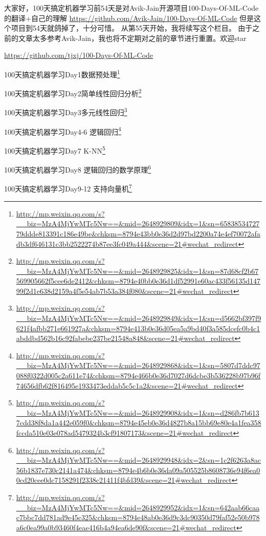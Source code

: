 \documentclass[]{ctexbook}
\renewcommand{\href}[2]{#2\footnote{\url{#1}}}
\begin{document}
大家好，100天搞定机器学习前54天是对Avik-Jain开源项目100-Days-Of-ML-Code的翻译+自己的理解 \url{https://github.com/Avik-Jain/100-Days-Of-ML-Code} 但是这个项目到54天就鸽掉了，十分可惜。
从第55天开始，我将续写这个栏目。 由于之前的文章太多参考Avik-Jain，我也将不定期对之前的章节进行重置。欢迎star

\url{https://github.com/tjxj/100-Days-Of-ML-Code}

\href{http://mp.weixin.qq.com/s?__biz=MzA4MjYwMTc5Nw==\&mid=2648929809\&idx=1\&sn=6583853472779ddde813391c186e49be\&chksm=8794e43bb0e36d2d97bd2200a74e4ef70072afadb3df646131c3bb2522274b87ee3fc049a444\&scene=21\#wechat_redirect}{100天搞定机器学习\textbar{}Day1数据预处理}

\href{http://mp.weixin.qq.com/s?__biz=MzA4MjYwMTc5Nw==\&mid=2648929825\&idx=1\&sn=87d68cf2b67569905662f5cee6de2412\&chksm=8794e40bb0e36d1df52991e60ac433f56135d14799f2d1e638d2159a4f5e54ab7b53a384f080\&scene=21\#wechat_redirect}{100天搞定机器学习\textbar{}Day2简单线性回归分析}

\href{http://mp.weixin.qq.com/s?__biz=MzA4MjYwMTc5Nw==\&mid=2648929849\&idx=1\&sn=d5662bf397f9621f4afbb271e661927a\&chksm=8794e413b0e36d05ea5a9bd40f3a585dcefc0b4c1abddbd562b16c92fabebe237be21548a848\&scene=21\#wechat_redirect}{100天搞定机器学习\textbar{}Day3多元线性回归}

\href{http://mp.weixin.qq.com/s?__biz=MzA4MjYwMTc5Nw==\&mid=2648929868\&idx=1\&sn=5807d7ddc97088f0322d005c2a611e74\&chksm=8794e466b0e36d7027d6dcbe3b536228b97b96f74656dfb62f816495e1933473eddab5c5c1a2\&scene=21\#wechat_redirect}{100天搞定机器学习\textbar{}Day4-6 逻辑回归}

\href{http://mp.weixin.qq.com/s?__biz=MzA4MjYwMTc5Nw==\&mid=2648929908\&idx=1\&sn=d286fb7b6137cdd38f8da1a442e059f0\&chksm=8794e45eb0e36d4827b8a15bb69e80e4a1fea358fccda510e03e078ad5479324b3cf91807173\&scene=21\#wechat_redirect}{100天搞定机器学习\textbar{}Day7 K-NN}

\href{http://mp.weixin.qq.com/s?__biz=MzA4MjYwMTc5Nw==\&mid=2648929948\&idx=2\&sn=1c2f6263a8ac56b1837e730c2141a474\&chksm=8794e4b6b0e36da09a505525b8608736e94f6ea00cd20cee0dc7158291f2338c21411f4bfd39\&scene=21\#wechat_redirect}{100天搞定机器学习\textbar{}Day8 逻辑回归的数学原理}

\href{http://mp.weixin.qq.com/s?__biz=MzA4MjYwMTc5Nw==\&mid=2648929952\&idx=1\&sn=642aab66caac7bbc7dd781ad9e45c325\&chksm=8794e48ab0e36d9c3dc90350d79faf52e50b978a6c0ea99a0b93460f4eae416b4a94ea6de90f\&scene=21\#wechat_redirect}{100天搞定机器学习\textbar{}Day9-12 支持向量机}
\end{document}
